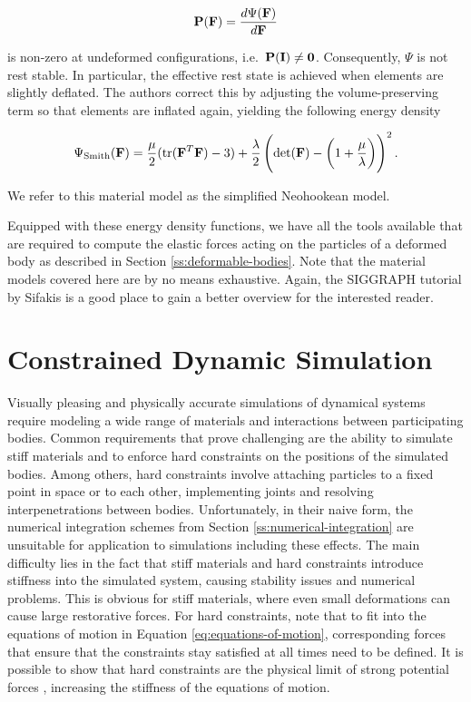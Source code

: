 \[
    \mathbf{P}(\mathbf{F}) = \frac{d\Psi(\mathbf{F})}{d\mathbf{F}}
\]

\noindent is non-zero at undeformed configurations, i.e.\ $\mathbf{P}(\mathbf{I}) \neq \mathbf{0}$. Consequently, $\Psi$ is not rest stable. In particular,
the effective rest state is achieved when elements are slightly deflated. The authors correct this by adjusting the volume-preserving term so that 
elements are inflated again, yielding the following energy density

\begin{equation}\label{eq:smith-neohookean-material-model}
    \Psi_{\text{Smith}}(\mathbf{F}) = \frac{\mu}{2}(\text{tr}(\mathbf{F}^T\mathbf{F}) - 3) + \frac{\lambda}{2}\left(\text{det}(\mathbf{F}) - 
    \left(1 + \frac{\mu}{\lambda}\right)\right)^2.
\end{equation}

\noindent We refer to this material model as the simplified Neohookean model.

Equipped with these energy density functions, we have all the tools available that are required to compute the elastic forces acting on the particles 
of a deformed body as described in Section \ref{ss:deformable-bodies}. Note that the material models covered here are by no means exhaustive. Again, the 
SIGGRAPH tutorial by Sifakis \cite{sifakis2012} is a good place to gain a better overview for the interested reader.

\section{Constrained Dynamic Simulation}\label{s:dynamic-simulation}
Visually pleasing and physically accurate simulations of dynamical systems require modeling a wide range of materials and 
interactions between participating bodies. Common requirements that prove challenging are the ability to simulate stiff materials
and to enforce hard constraints on the positions of the simulated bodies. Among others, hard constraints involve attaching particles
to a fixed point in space or to each other, implementing joints and resolving interpenetrations between bodies. Unfortunately, in their 
naive form, the numerical integration schemes from Section \ref{ss:numerical-integration} are unsuitable for application to simulations 
including these effects. The main difficulty lies in the fact that stiff materials and hard constraints introduce stiffness into 
the simulated system, causing stability issues and numerical problems. This is obvious for stiff materials, where even small 
deformations can cause large restorative forces. For hard constraints, note that to fit into the equations of motion in 
Equation \ref{eq:equations-of-motion}, corresponding forces that ensure that the constraints stay satisfied at all times need to be defined. 
It is possible to show that hard constraints are the physical limit of strong potential forces \cite{servin2006}, increasing the 
stiffness of the equations of motion. 

